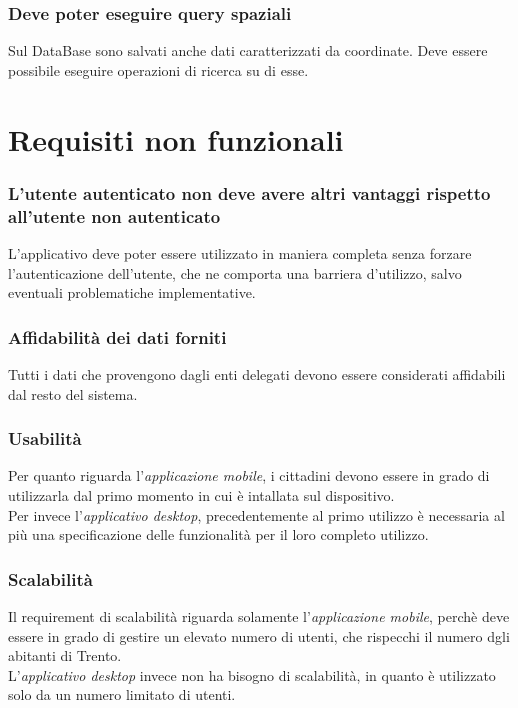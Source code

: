 \documentclass{article}
\begin{document}
\subsubsection{Deve poter eseguire query spaziali}
Sul DataBase sono salvati anche dati caratterizzati da coordinate. Deve essere possibile eseguire operazioni di ricerca su di esse.

\clearpage

\section{Requisiti non funzionali}

\subsubsection{L'utente autenticato non deve avere altri vantaggi rispetto all'utente non autenticato}
L'applicativo deve poter essere utilizzato in maniera completa senza forzare l'autenticazione dell'utente, che ne comporta una barriera d'utilizzo, salvo eventuali problematiche implementative.

\subsubsection{Affidabilità dei dati forniti}
Tutti i dati che provengono dagli enti delegati devono essere considerati affidabili dal resto del sistema.

\subsubsection{Usabilità}
Per quanto riguarda l'\textit{applicazione mobile}, i cittadini devono essere in grado di utilizzarla dal primo momento in cui è intallata sul dispositivo.\\
Per invece l'\textit{applicativo desktop}, precedentemente al primo utilizzo è necessaria al più una specificazione delle funzionalità per il loro completo utilizzo.

\subsubsection{Scalabilità}
Il requirement di scalabilità riguarda solamente l'\textit{applicazione mobile}, perchè deve essere in grado di gestire un elevato numero di utenti, che rispecchi il numero dgli abitanti di Trento.\\
L'\textit{applicativo desktop} invece non ha bisogno di scalabilità, in quanto è utilizzato solo da un numero limitato di utenti.
\end{document}

